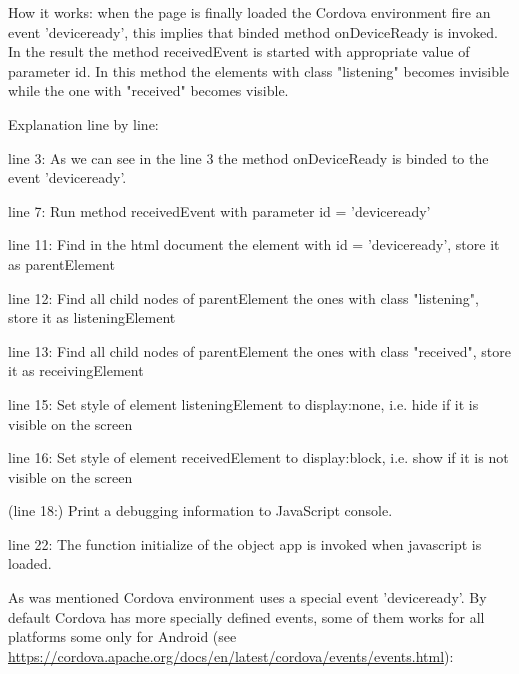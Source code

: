 \begin{explain}
How it works: when the page is finally loaded the Cordova environment fire an event 'deviceready', this implies that binded method onDeviceReady is invoked. In the result the method receivedEvent is started with appropriate value of parameter id. In this method the elements with class "listening" becomes invisible while the one with "received" becomes visible.

Explanation line by line:
\begin{description}
\item{line 3:} As we can see in the line 3 the method onDeviceReady is binded to the event 'deviceready'.
\item{line 7:} Run method receivedEvent with parameter id = 'deviceready'
\item{line 11:} Find in the html document the element with id = 'deviceready', store it as parentElement
\item{line 12:} Find all child nodes of parentElement the ones with class "listening", store it as listeningElement
\item{line 13:} Find all child nodes of parentElement the ones with class "received", store it as receivingElement
\item{line 15:} Set style of element listeningElement to display:none, i.e. hide if it is visible on the screen
\item{line 16:} Set style of element receivedElement to display:block, i.e. show if it is not visible on the screen
\item(line 18:) Print a debugging information to JavaScript console.
\item{line 22:} The function initialize of the object app is invoked when javascript is loaded.
\end{description}
\end{explain}

As was mentioned Cordova environment uses a special event 'deviceready'. By default Cordova has more specially defined events, some of them works for all platforms some only for Android (see \url{https://cordova.apache.org/docs/en/latest/cordova/events/events.html}):

